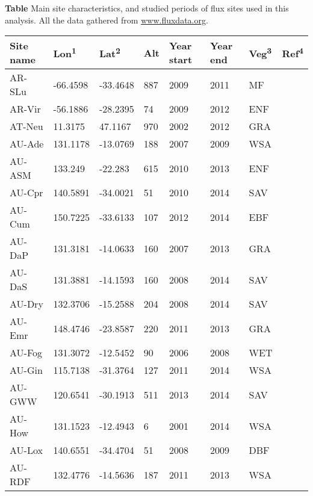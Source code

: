 \documentclass[a4paper, 12pt]{article}
\begin{document}
 
\setlength{\parindent}{0em} 
\textbf{Table} Main site characteristics, and studied periods of flux sites used in this analysis. All the data gathered from \href{www.fluxdata.org}{www.fluxdata.org}. 
\begin{longtable}{l l l l l l l l} 
\hline 
\multicolumn{1}{l}{\textbf{Site name}} &  
\multicolumn{1}{l}{\textbf{Lon\textsuperscript{1}}} &  
\multicolumn{1}{l}{\textbf{Lat\textsuperscript{2}}} &  
\multicolumn{1}{l}{\textbf{Alt}} &  
\multicolumn{1}{l}{\textbf{Year start}} &  
\multicolumn{1}{l}{\textbf{Year end}} &  
\multicolumn{1}{l}{\textbf{Veg\textsuperscript{3}}} &  
\multicolumn{1}{l}{\textbf{Ref\textsuperscript{4}}} \\[0.5ex] 
\hline 
\endhead  
AR-SLu & -66.4598 & -33.4648 & 887 & 2009 & 2011 & MF & \cite{AR-SLu} \\ 
AR-Vir & -56.1886 & -28.2395 & 74 & 2009 & 2012 & ENF & \cite{AR-Vir} \\ 
AT-Neu & 11.3175 & 47.1167 & 970 & 2002 & 2012 & GRA & \cite{AT-Neu} \\ 
AU-Ade & 131.1178 & -13.0769 & 188 & 2007 & 2009 & WSA & \cite{AU-Ade} \\ 
AU-ASM & 133.249 & -22.283 & 615 & 2010 & 2013 & ENF & \cite{AU-ASM} \\ 
AU-Cpr & 140.5891 & -34.0021 & 51 & 2010 & 2014 & SAV & \cite{AU-Cpr} \\ 
AU-Cum & 150.7225 & -33.6133 & 107 & 2012 & 2014 & EBF & \cite{AU-Cum} \\ 
AU-DaP & 131.3181 & -14.0633 & 160 & 2007 & 2013 & GRA & \cite{AU-DaP} \\ 
AU-DaS & 131.3881 & -14.1593 & 160 & 2008 & 2014 & SAV & \cite{AU-DaS} \\ 
AU-Dry & 132.3706 & -15.2588 & 204 & 2008 & 2014 & SAV & \cite{AU-Dry} \\ 
AU-Emr & 148.4746 & -23.8587 & 220 & 2011 & 2013 & GRA & \cite{AU-Emr} \\ 
AU-Fog & 131.3072 & -12.5452 & 90 & 2006 & 2008 & WET & \cite{AU-Fog} \\ 
AU-Gin & 115.7138 & -31.3764 & 127 & 2011 & 2014 & WSA & \cite{AU-Gin} \\ 
AU-GWW & 120.6541 & -30.1913 & 511 & 2013 & 2014 & SAV & \cite{AU-GWW} \\ 
AU-How & 131.1523 & -12.4943 & 6 & 2001 & 2014 & WSA & \cite{AU-How} \\ 
AU-Lox & 140.6551 & -34.4704 & 51 & 2008 & 2009 & DBF & \cite{AU-Lox} \\ 
AU-RDF & 132.4776 & -14.5636 & 187 & 2011 & 2013 & WSA & \cite{AU-RDF} \\ 

\end{longtable}
\end{document}
